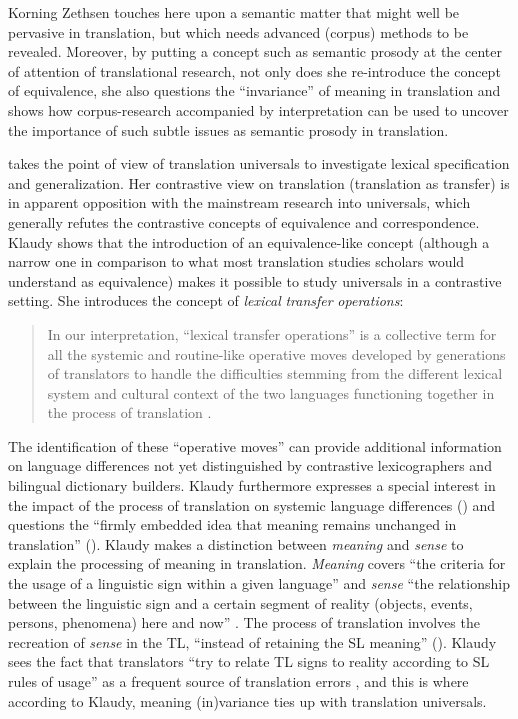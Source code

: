 Korning Zethsen touches here upon a semantic matter that might well be pervasive in translation, but which needs advanced (corpus) methods to be revealed. Moreover, by putting a concept such as semantic prosody at the center of attention of translational research, not only does she re-introduce the concept of equivalence, she also questions the ``invariance'' of meaning in translation and shows how corpus-research accompanied by interpretation can be used to uncover the importance of such subtle issues as semantic prosody in translation.

\citet{lewandowska-tomasczyk_specification_2010} takes the point of view of translation universals to investigate lexical specification and generalization. Her contrastive view on translation (translation as transfer) is in apparent opposition with the mainstream research into universals, which generally refutes the contrastive concepts of equivalence and correspondence. Klaudy shows that the introduction of an equivalence-like concept (although a narrow one in comparison to what most translation studies scholars would understand as equivalence) makes it possible to study universals in a contrastive setting. She introduces the concept of \textit{lexical} \textit{transfer} \textit{operations}:

\begin{quote}
In our interpretation, “lexical transfer operations” is a collective term for all the systemic and routine-like operative moves developed by generations of translators to handle the difficulties stemming from the different lexical system and cultural context of the two languages functioning together in the process of translation \citep[81]{lewandowska-tomasczyk_specification_2010}.
\end{quote}

The identification of these “operative moves” can provide additional information on language differences not yet distinguished by contrastive lexicographers and bilingual dictionary builders. Klaudy furthermore expresses a special interest in the impact of the process of translation on systemic language differences (\citeyear[82]{lewandowska-tomasczyk_specification_2010}) and questions the “firmly embedded idea that meaning remains unchanged in translation” (\citeyear[82]{lewandowska-tomasczyk_specification_2010}). Klaudy makes a distinction between \textit{meaning} and \textit{sense} to explain the processing of meaning in translation. \textit{Meaning} covers “the criteria for the usage of a linguistic sign within a given language” and \textit{sense} “the relationship between the linguistic sign and a certain segment of reality (objects, events, persons, phenomena) here and now” \citep[83]{lewandowska-tomasczyk_specification_2010}. The process of translation involves the recreation of \textit{sense} in the TL, “instead of retaining the SL meaning” (\citeyear[83]{lewandowska-tomasczyk_specification_2010}). Klaudy sees the fact that translators “try to relate TL signs to reality according to SL rules of usage” as a frequent source of translation errors \citep[83]{lewandowska-tomasczyk_specification_2010}, and this is where according to Klaudy, meaning (in)variance ties up with translation universals.

